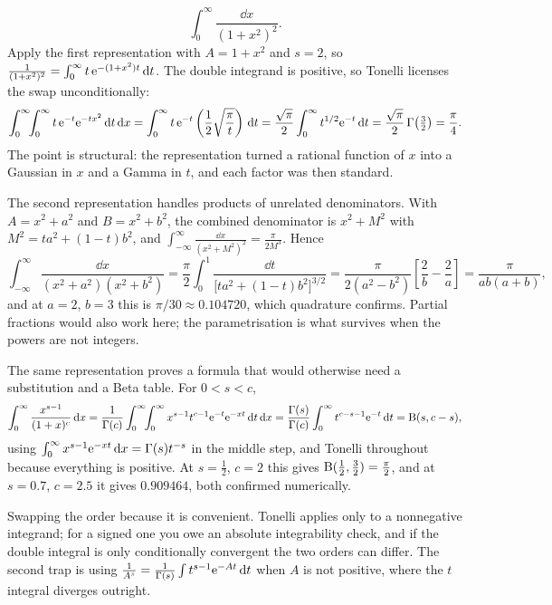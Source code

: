 \begin{worked}
\[\int_0^{\infty}\frac{\dd x}{(1+x^{2})^{2}}.\]
Apply the first representation with $A=1+x^{2}$ and $s=2$, so $\frac{1}{(1+x^{2})^{2}}=\int_0^\infty t\,\mathrm{e}^{-(1+x^{2})t}\,\mathrm{d} t$. The double integrand is positive, so Tonelli licenses the swap unconditionally:
\[\int_0^{\infty}\!\!\int_0^{\infty}t\,\mathrm{e}^{-t}\mathrm{e}^{-tx^{2}}\,\mathrm{d} t\,\mathrm{d} x=\int_0^{\infty}t\,\mathrm{e}^{-t}\left(\frac12\sqrt{\frac{\pi}{t}}\right)\,\mathrm{d} t=\frac{\sqrt{\pi}}{2}\int_0^\infty t^{1/2}\mathrm{e}^{-t}\,\mathrm{d} t=\frac{\sqrt{\pi}}{2}\,\Gamma\!\left(\tfrac32\right)=\frac{\pi}{4}.\]
The point is structural: the representation turned a rational function of $x$ into a Gaussian in $x$ and a Gamma in $t$, and each factor was then standard.

The second representation handles products of unrelated denominators. With $A=x^{2}+a^{2}$ and $B=x^{2}+b^{2}$, the combined denominator is $x^{2}+M^{2}$ with $M^{2}=ta^{2}+(1-t)b^{2}$, and $\int_{-\infty}^{\infty}\frac{\dd x}{(x^{2}+M^{2})^{2}}=\frac{\pi}{2M^{3}}$. Hence
\[\int_{-\infty}^{\infty}\frac{\dd x}{(x^{2}+a^{2})(x^{2}+b^{2})}=\frac{\pi}{2}\int_0^1\frac{\dd t}{\bigl[ta^{2}+(1-t)b^{2}\bigr]^{3/2}}=\frac{\pi}{2(a^{2}-b^{2})}\left[\frac{2}{b}-\frac{2}{a}\right]=\frac{\pi}{ab(a+b)},\]
and at $a=2$, $b=3$ this is $\pi/30\approx0.104720$, which quadrature confirms. Partial fractions would also work here; the parametrisation is what survives when the powers are not integers.

The same representation proves a formula that would otherwise need a substitution and a Beta table. For $0<s<c$,
\[\int_0^{\infty}\frac{x^{s-1}}{(1+x)^{c}}\,\mathrm{d} x=\frac{1}{\Gamma(c)}\int_0^{\infty}\!\!\int_0^{\infty}x^{s-1}t^{c-1}\mathrm{e}^{-t}\mathrm{e}^{-xt}\,\mathrm{d} t\,\mathrm{d} x=\frac{\Gamma(s)}{\Gamma(c)}\int_0^{\infty}t^{c-s-1}\mathrm{e}^{-t}\,\mathrm{d} t=\mathrm{B}(s,c-s),\]
using $\int_0^\infty x^{s-1}\mathrm{e}^{-xt}\,\mathrm{d} x=\Gamma(s)t^{-s}$ in the middle step, and Tonelli throughout because everything is positive. At $s=\tfrac12$, $c=2$ this gives $\mathrm{B}(\tfrac12,\tfrac32)=\tfrac{\pi}{2}$, and at $s=0.7$, $c=2.5$ it gives $0.909464$, both confirmed numerically.
\end{worked}

\begin{trap}
Swapping the order because it is convenient. Tonelli applies only to a nonnegative integrand; for a signed one you owe an absolute integrability check, and if the double integral is only conditionally convergent the two orders can differ. The second trap is using $\frac{1}{A^{s}}=\frac{1}{\Gamma(s)}\int t^{s-1}\mathrm{e}^{-At}\,\mathrm{d} t$ when $A$ is not positive, where the $t$ integral diverges outright.
\end{trap}

